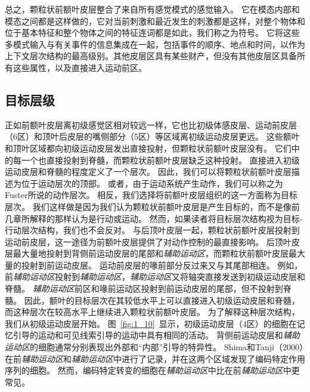 总之，颗粒状前额叶皮层整合了来自所有感觉模式的感觉输入。
它在模态内部和模态之间都是这样做的，它对当前刺激和最近发生的刺激都是这样，对整个物体和位于基本特征和整个物体之间的特征连词都是如此，我们称之为符号。
它将这些多模式输入与有关事件的信息集成在一起，包括事件的顺序、地点和时间，以作为上下文层次结构的最高级别。其他皮层区具有某些财产，但没有其他皮层区具备所有这些属性，以及直接进入运动前区。



\subsection{目标层级}
\par
正如前额叶皮层离初级感觉区相对较远一样，它也比初级体感皮层、运动前皮层（6区）和顶叶后皮层的嘴侧部分（5区）等区域离初级运动皮层更远。
这些额叶和顶叶区域都向初级运动皮层发出直接投射，但颗粒状前额叶皮层没有\cite{jones1970anatomical,lu1994interconnections}。
它们中的每一个也直接投射到脊髓，而颗粒状前额叶皮层缺乏这种投射\cite{murray1991contributions}。
直接进入初级运动皮层和脊髓的程度定义了一个层次。
因此，我们可以将颗粒状前额叶皮层描述为位于运动层次的顶部。
或者，由于运动系统产生动作，我们可以称之为Fuster\cite{fuster1988prefrontal}所说的动作层次。
相反，我们选择将前额叶皮层组织的这一方面称为目标层次。
我们这样做是因为我们认为颗粒状前额叶皮层是产生目标的，而不是像前几章所解释的那样认为是行动或运动。
然而，如果读者将目标层次结构视为目标-行动层次结构，我们也不会反对。
与后顶叶皮层一起，颗粒状前额叶皮层投射到运动前皮层，这一途径为前额叶皮层提供了对动作控制的最直接影响。
后顶叶皮层最大量地投射到背侧前运动皮层的尾部和\textit{辅助运动区}，而颗粒状前额叶皮层最大量的投射到前运动皮层\cite{rizzolatti2001cortical,luppino2003prefrontal}。
运动前皮层的喙前部分反过来又与其尾部相连。
例如，前\textit{辅助运动区}投射到\textit{辅助运动区}，\textit{辅助运动区}又将轴突直接发送到初级运动皮层\cite{luppino1993corticocortical}和脊髓\cite{murray1981organization}。
\textit{辅助运动区}前区和喙前运动区投射到前运动皮层的尾部，但不投射到脊髓\cite{he1995topographic}。
因此，额叶的目标层次在其较低水平上可以直接进入初级运动皮层和脊髓，而这种层次在较高水平上继续进入颗粒状前额叶皮层。
为了解释这种层次结构，我们从初级运动皮层开始。
图~\ref{fig:1_10}~显示，初级运动皮层（4区）的细胞在记忆引导的运动和可见线索引导的运动中具有相同的活动。
背侧前运动皮层和\textit{辅助运动区}的细胞通常分别表现出外部和“内部”引导的特异性。
Shima和Tanji（2000）在前\textit{辅助运动区}和\textit{辅助运动区}中进行了记录，并在这两个区域发现了编码特定作用序列的细胞。
然而，编码特定转变的细胞在\textit{辅助运动区}中比在前\textit{辅助运动区}中更常见。
